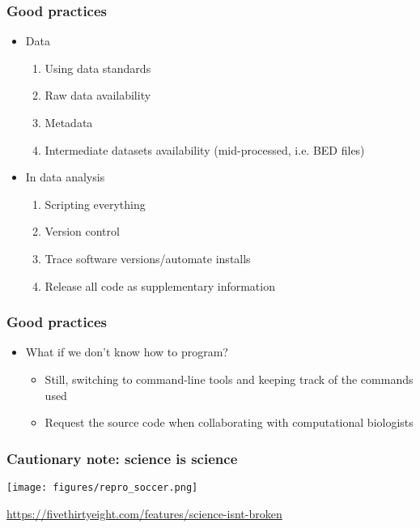 \documentclass{beamer}
\begin{document}
\begin{frame}
  \frametitle{Good practices}
  \begin{itemize}
  \item Data
    \begin{enumerate}
    \item Using data standards
    \item Raw data availability
    \item Metadata
    \item Intermediate datasets availability (mid-processed, i.e. BED files)
    \end{enumerate}
  \item In data analysis
    \begin{enumerate}
    \item Scripting everything
    \item Version control
    \item Trace software versions/automate installs
    \item Release all code as supplementary information
    \end{enumerate}
  \end{itemize}
\end{frame}



\begin{frame}
  \frametitle{Good practices}
 \begin{itemize}
  \item What if we don't know how to program?
    \begin{itemize}
    \item Still, switching to command-line tools and keeping track of the commands used
    \item Request the source code when collaborating with computational biologists
    \end{itemize}
  \end{itemize}
\end{frame}


\begin{frame}
  \frametitle{Cautionary note: science is science}
\centering
\texttt{[image: figures/repro\_soccer.png]}

{\tiny \url{https://fivethirtyeight.com/features/science-isnt-broken}}
\end{frame}
\end{document}
